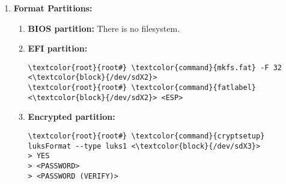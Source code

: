 \documentclass[10pt, a4paper, onecolumn, openany]{book} %
\begin{document}
\begin{enumerate}
\begin{enumerate}
\begin{Verbatim}[commandchars=\\\{\}]
\textcolor{root}{cfdisk>} \textcolor{command}{W}
\textcolor{root}{cfdisk>} \textcolor{command}{yes}
\end{Verbatim}
        \item \textbf{Quit cfdisk:}
\begin{Verbatim}[commandchars=\\\{\}]
\textcolor{root}{cfdisk>} \textcolor{command}{Q}
\end{Verbatim}
        \item \textbf{Name partitions:}
\begin{Verbatim}[commandchars=\\\{\}]
\textcolor{root}{root#} \textcolor{command}{parted} -s <\textcolor{block}{/dev/sdX}> name 1 GRUB_BIOS
\textcolor{root}{root#} \textcolor{command}{parted} -s <\textcolor{block}{/dev/sdX}> name 2 ESP
\textcolor{root}{root#} \textcolor{command}{parted} -s <\textcolor{block}{/dev/sdX}> name 3 LUKS
\end{Verbatim}
    \end{enumerate}
    
    \item \textbf{Format Partitions:}
        \begin{enumerate}
            \item \textbf{BIOS partition:}
\newline There is no filesystem.         
            \item \textbf{EFI partition:}
\begin{Verbatim}[commandchars=\\\{\}]
\textcolor{root}{root#} \textcolor{command}{mkfs.fat} -F 32 <\textcolor{block}{/dev/sdX2}>
\textcolor{root}{root#} \textcolor{command}{fatlabel} <\textcolor{block}{/dev/sdX2}> <ESP>
\end{Verbatim}                
            \item \textbf{Encrypted partition:}
\begin{Verbatim}[commandchars=\\\{\}]
\textcolor{root}{root#} \textcolor{command}{cryptsetup} luksFormat --type luks1 <\textcolor{block}{/dev/sdX3}>
> YES
> <PASSWORD>
> <PASSWORD (VERIFY)>
\end{Verbatim}
        \end{enumerate}


\end{enumerate}
\end{document}
